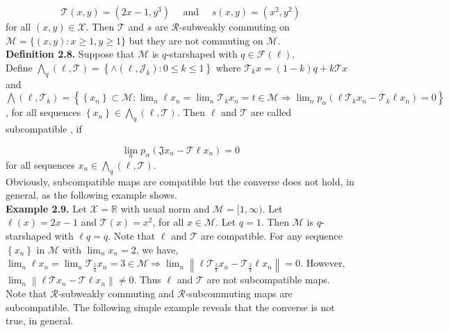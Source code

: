 \documentclass[12pt,a4paper,two side]{article}
\begin{document}
$$
\mathcal{T}(x, y)=\left(2 x-1, y^3\right) \quad \text { and } \quad s(x, y)=\left(x^2, y^2\right)
$$
for all $(x, y) \in \mathcal{X}$. Then $\mathcal{T}$ and $s$ are $\mathcal{R}$-subweakly commuting on $\mathcal{M}=\{(x, y): x \geq 1, y \geq 1\}$ but they are not commuting on $\mathcal{M}$.\\

\textbf{Definition 2.8.} Suppose that $\mathcal{M}$ is $q$-starshaped with $q \in \mathcal{F}(\ell)$.\\
Define $\bigwedge_q(\ell, \mathcal{T})=\left\{\wedge\left(\ell, \mathcal{J}_k\right): 0 \leq k \leq 1\right\}$ where $\mathcal{T}_k x=(1-k) q+k \mathcal{T} x$ and\\
$\bigwedge\left(\ell, \mathcal{T}_k\right)=\left\{\left\{x_n\right\} \subset \mathcal{M}:\lim _n \ell x_n=\lim _n \mathcal{T}_k x_n=t \in \mathcal{M} \Rightarrow \lim _n p_\alpha\left(\ell \mathcal{T}_k x_n-\mathcal{T}_k \ell x_n\right)=0\right\}$, for all sequences $\left\{x_n\right\} \in \bigwedge_q(\ell, \mathcal{T})$. Then $\ell$ and $\mathcal{T}$ are called subcompatible \cite{citation-key16},\cite{17} if

$$
\lim _n p_\alpha\left(\mathfrak{J} x_n-\mathcal{T} \ell x_n\right)=0
$$
for all sequences $x_n \in \bigwedge_q(\ell, \mathcal{T})$.\\

Obviously, subcompatible maps are compatible but the converse does not hold, in general, as the following example shows.\\

\textbf{Example 2.9.} Let $\mathcal{X}=\mathbb{R}$ with usual norm and $\mathcal{M}=[1, \infty)$. Let $\ell(x)=2 x-1$ and $\mathcal{T}(x)=x^2$, for all $x \in \mathcal{M}$. Let $q=1$. Then $\mathcal{M}$ is $q$-starshaped with $\ell q=q$. Note that $\ell$ and $\mathcal{T}$ are compatible. For any sequence $\left\{x_n\right\}$ in $\mathcal{M}$ with $\lim _n x_n=2$, we have, $\lim _n \ell x_n=\lim _n \mathcal{T}_{\frac{2}{3}} x_n=3 \in \mathcal{M} \Rightarrow \lim _n\left\|\ell \mathcal{T}_{\frac{2}{3}} x_n-\mathcal{T}_{\frac{2}{3}} \ell x_n\right\|=0$. However, $\lim _n\left\|\ell \mathcal{T} x_n-\mathcal{T} \ell x_n\right\| \neq 0$. Thus $\ell$ and $\mathcal{T}$ are not subcompatible maps.\\

Note that $\mathscr{R}$-subweakly commuting and $\mathcal{R}$-subcommuting maps are subcompatible. The following simple example reveals that the converse is not true, in general.\\
\end{document}
